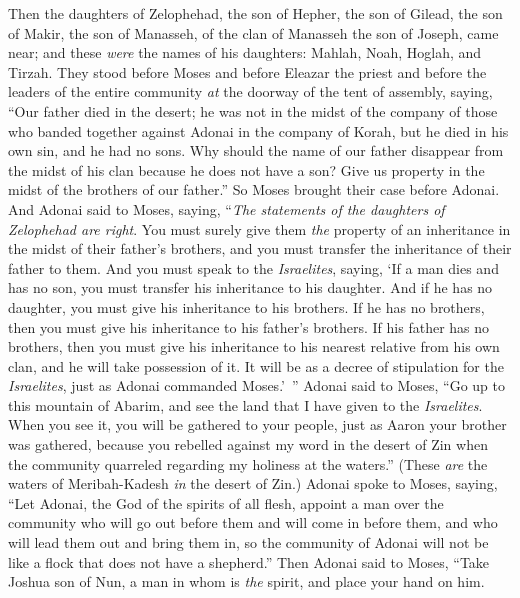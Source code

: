 \begin{biblechapter} %
 Then the daughters of Zelophehad, the son of Hepher, the son of Gilead, the son of Makir, the son of Manasseh, of the clan of Manasseh the son of Joseph, came near; and these \textit{were} the names of his daughters: Mahlah, Noah, Hoglah, and Tirzah.
\verse They stood before Moses and before Eleazar the priest and before the leaders of the entire community \textit{at} the doorway of the tent of assembly, saying,
\verse “Our father died in the desert; he was not in the midst of the company of those who banded together against Adonai in the company of Korah, but he died in his own sin, and he had no sons.
\verse Why should the name of our father disappear from the midst of his clan because he does not have a son? Give us property in the midst of the brothers of our father.”
\verse So Moses brought their case before Adonai.
\verse And Adonai said to Moses, saying,
\verse “\textit{The statements of the daughters of Zelophehad are right}. You must surely give them \textit{the} property of an inheritance in the midst of their father’s brothers, and you must transfer the inheritance of their father to them.
\verse And you must speak to the \textit{Israelites}, saying, ‘If a man dies and has no son, you must transfer his inheritance to his daughter.
\verse And if he has no daughter, you must give his inheritance to his brothers.
\verse If he has no brothers, then you must give his inheritance to his father’s brothers.
\verse If his father has no brothers, then you must give his inheritance to his nearest relative from his own clan, and he will take possession of it. It will be as a decree of stipulation for the \textit{Israelites}, just as Adonai commanded Moses.’ ”
\verse Adonai said to Moses, “Go up to this mountain of Abarim, and see the land that I have given to the \textit{Israelites}.
\verse When you see it, you will be gathered to your people, just as Aaron your brother was gathered,
\verse because you rebelled against my word in the desert of Zin when the community quarreled regarding my holiness at the waters.” (These \textit{are} the waters of Meribah-Kadesh \textit{in} the desert of Zin.)
 Adonai spoke to Moses, saying,
\verse “Let Adonai, the God of the spirits of all flesh, appoint a man over the community
\verse who will go out before them and will come in before them, and who will lead them out and bring them in, so the community of Adonai will not be like a flock that does not have a shepherd.”
\verse Then Adonai said to Moses, “Take Joshua son of Nun, a man in whom is \textit{the} spirit, and place your hand on him.

\end{biblechapter}
